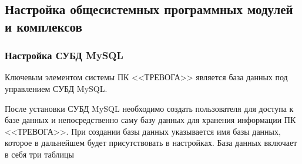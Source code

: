 \documentclass[12pt]{article}[a4paper,14pt,russian]
\begin{document}
	\subsection {Настройка общесистемных программных модулей и комплексов}
	
	\subsubsection {Настройка СУБД MySQL}
	Ключевым элементом системы ПК <<ТРЕВОГА>> является база данных под управлением СУБД MySQL. 
	
	После установки СУБД MySQL необходимо создать пользователя для доступа к базе данных и непосредственно саму базу данных для хранения информации ПК <<ТРЕВОГА>>. При создании базы данных указывается имя базы данных, которое в дальнейшем будет присутствовать в настройках. База данных включает в себя три таблицы
\end{document}
